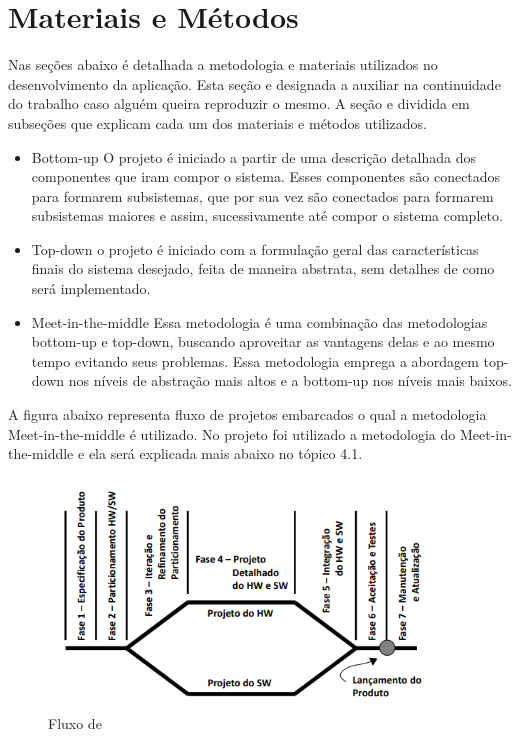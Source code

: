 \documentclass[12pt]{article}
\begin{document}
\section{Materiais e Métodos}
Nas seções abaixo é detalhada a metodologia e materiais utilizados no desenvolvimento da aplicação.
Esta seção e designada a auxiliar na continuidade do trabalho caso alguém queira reproduzir o mesmo. A seção e dividida em subseções que explicam cada um dos materiais e métodos utilizados.

\begin{itemize}
    \item Bottom-up
        O projeto é iniciado a partir de uma descrição detalhada dos componentes que iram compor o sistema. Esses componentes são conectados para formarem subsistemas, que por sua vez são conectados para formarem subsistemas maiores e assim, sucessivamente até compor o sistema completo.
    
    \item Top-down
    o projeto é iniciado com a formulação geral das características finais do sistema desejado, feita de maneira abstrata, sem detalhes de como será implementado.
    
    \item Meet-in-the-middle
    Essa metodologia é uma combinação das metodologias bottom-up e top-down, buscando aproveitar as vantagens delas e ao mesmo tempo evitando seus problemas. Essa metodologia emprega a abordagem top-down nos níveis de abstração mais altos e a bottom-up nos níveis mais baixos.
    
\end{itemize}

A figura abaixo representa fluxo de projetos embarcados o qual a metodologia Meet-in-the-middle é utilizado. No projeto foi utilizado a metodologia do Meet-in-the-middle e ela será explicada mais abaixo no tópico 4.1.

\begin{figure}[H]
\centering
\includegraphics[scale=.6]{FPE.PNG}
\caption{Fluxo de }
\end{figure}
\end{document}
